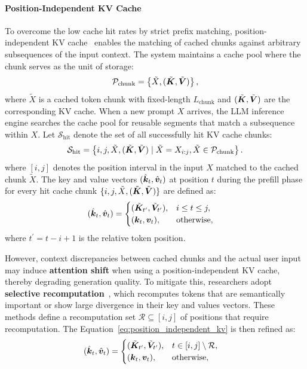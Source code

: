 \paragraph{Position-Independent KV Cache}  
To overcome the low cache hit rates by strict prefix matching, position-independent KV cache~\cite{yao2025cacheblend, hu2025epic, wang2025mepic, yang2025kvlink} enables the matching of cached chunks against arbitrary subsequences of the input context. The system maintains a cache pool where the chunk serves as the unit of storage:
\begin{align}\label{eq:chunk_cache_pool}
    \mathcal{P}_{\text{chunk}} = \left\{\tilde{X}, (\tilde{\bm{K}}, \tilde{\bm{V}})\right\},
\end{align}
where $\tilde{X}$ is a cached token chunk with fixed-length $L_\text{chunk}$ and $(\tilde{\bm{K}}, \tilde{\bm{V}})$ are the corresponding KV cache.
% 
When a new prompt $X$ arrives, the LLM inference engine searches the cache pool for reusable segments that match a subsequence within $X$. Let $\mathcal{S}_\text{hit}$ denote the set of all successfully hit KV cache chunks:
\begin{align}\label{eq:matched_segments}
    \mathcal{S}_\text{hit} = \left\{ i, j, \tilde{X}, (\tilde{\bm{K}}, \tilde{\bm{V}}) \mid \tilde{X} = X_{i : j}, \tilde{X} \in \mathcal{P}_{\text{chunk}}\right\}.
\end{align}
where $[i, j]$ denotes the position interval in the input $X$ matched to the cached chunk $\tilde{X}$. The key and value vectors $(\hat{\bm{k}}_t, \hat{\bm{v}}_t)$ at position $t$ during the prefill phase for every hit cache chunk $\{i, j, \tilde{X}, (\tilde{\bm{K}}, \tilde{\bm{V}})\}$  are defined as:
\begin{align}\label{eq:position_independent_kv}
    (\hat{\bm{k}}_t, \hat{\bm{v}}_t) &= \begin{cases}
        (\tilde{\bm{K}}_{t^\prime}, \tilde{\bm{V}}_{t^\prime}), & i \leq t \leq j, \\
        (\bm{k}_t, \bm{v}_t), & \text{otherwise},
    \end{cases}
\end{align}
where $t^\prime = t - i + 1$ is the relative token position.

However, context discrepancies between cached chunks and the actual user input may induce \textbf{attention shift} when using a position-independent KV cache, thereby degrading generation quality. To mitigate this, researchers adopt \textbf{selective recomputation}~\cite{yao2025cacheblend, hu2025epic, yang2025kvshare}, which recomputes tokens that are semantically important or show large divergence in their key and values vectors. 
% 
These methods define a recomputation set $\mathcal{R} \subseteq [i, j]$ of positions that require recomputation. The Equation~\ref{eq:position_independent_kv} is then refined as:
\begin{align}\label{eq:recomputation_position_independent_kv}
    (\hat{\bm{k}}_t, \hat{\bm{v}}_t) &= \begin{cases}
        (\tilde{\bm{K}}_{t^\prime}, \tilde{\bm{V}}_{t^\prime}), & t \in [i, j]\setminus \mathcal{R}, \\
        (\bm{k}_t, \bm{v}_t), & \text{otherwise},
    \end{cases}
\end{align}
